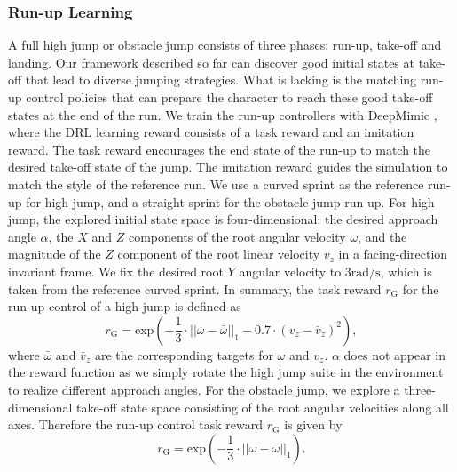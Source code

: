 \subsubsection{Run-up Learning}
\label{sec:Experiments-Runup}
A full high jump or obstacle jump consists of three phases: run-up, take-off and landing. Our framework described so far can discover good initial states at take-off that lead to diverse jumping strategies. What is lacking is the matching run-up control policies that can prepare the character to reach these good take-off states at the end of the run. We train the run-up controllers with DeepMimic \cite{Peng:2018:DeepMimic}, where the DRL learning reward consists of a task reward and an imitation reward. The task reward encourages the end state of the run-up to match the desired take-off state of the jump. The imitation reward guides the simulation to match the style of the reference run. We use a curved sprint as the reference run-up for high jump, and a straight sprint for the obstacle jump run-up. For high jump, the explored initial state space is four-dimensional: the desired approach angle $\alpha$, the $X$ and $Z$ components of the root angular velocity $\omega$, and the magnitude of the $Z$ component of the root linear velocity $v_z$ in a facing-direction invariant frame. We fix the desired root $Y$ angular velocity to $3 \text{rad}/\text{s}$, which is taken from the reference curved sprint. In summary, the task reward $r_\text{G}$ for the run-up control of a high jump is defined as
\begin{equation}
    r_\text{G} = \text{exp}\left(-\frac{1}{3}\cdot||\omega - \bar{\omega}||_1 - 0.7\cdot(v_z - \bar{v}_z)^2\right),
\end{equation}
where $\bar{\omega}$ and $\bar{v}_z$ are the corresponding targets for $\omega$ and $v_z$. $\alpha$ does not appear in the reward function as we simply rotate the high jump suite in the environment to realize different approach angles. For the obstacle jump, we explore a three-dimensional take-off state space consisting of the root angular velocities along all axes. Therefore the run-up control task reward $r_\text{G}$ is given by
\begin{equation}
    r_\text{G} = \text{exp}(-\frac{1}{3}\cdot||\omega - \bar{\omega}||_1).
\end{equation}


